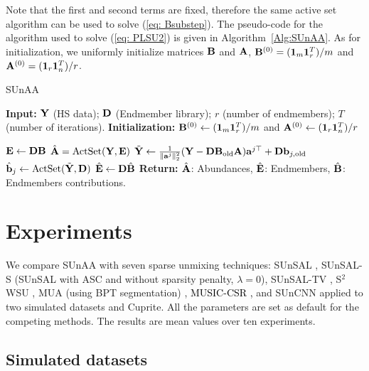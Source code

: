 Note that the first and second terms are fixed, therefore the same active set algorithm can be used to solve (\ref{eq: Bsubstep}). The pseudo-code for the algorithm used to solve (\ref{eq: PLSU2}) is given in Algorithm~\ref{Alg:SUnAA}. As for initialization, we uniformly initialize matrices $\mathbf B$ and $\mathbf A$, \ie $\mathbf B^{(0)}=({\bf 1}_{m}{\bf 1}_{r}^{T})/m$ and $\mathbf A^{(0)} = ({\bf 1}_{r}{\bf 1}_{n}^{T})/r$.


\begin{algorithm}[h]
\caption{{SUnAA}}
\label{Alg:SUnAA}
\begin{algorithmic}[1]
\State \textbf{Input:} ${\bf Y}$ (HS data); ${\bf D}$ (Endmember library); $r$ (number of endmembers); $T$ (number of iterations).
\State \textbf{Initialization:}  $\mathbf B^{(0)} \gets ({\bf 1}_{m}{\bf 1}_{r}^{T})/m$ and $\mathbf A^{(0)} \gets ({\bf 1}_{r}{\bf 1}_{n}^{T})/r$

\State $\mathbf E \gets \mathbf D \mathbf B$
\State  $\hat{\mathbf A} =\text{ActSet}(\mathbf Y,\mathbf E)$
\State $\Tilde{\mathbf Y} \gets \frac{1}{\|\mathbf a^j\|_2^2} (\mathbf Y - \mathbf D \mathbf B_{\text{old}} \mathbf A) \mathbf a^{j \top} + \mathbf D \mathbf b_{j, \text{old}}$
\State $\hat{\mathbf b}_j \gets \text{ActSet}(\Tilde{\mathbf Y}, \mathbf D)$
\EndFor
\EndFor
\State $\hat{\mathbf E} \gets \mathbf D \hat{\mathbf B}$
\State \textbf{Return:} $\hat{\mathbf A}$: Abundances, $\hat{\mathbf E}$: Endmembers, $\hat{\mathbf B}$: Endmembers contributions.
\end{algorithmic}
\end{algorithm}


\section{Experiments}
\label{sec:exp}

We compare SUnAA with seven sparse unmixing techniques: SUnSAL \cite{bioucas-dias_alternating_2010}, SUnSAL-S (SUnSAL with ASC and without sparsity penalty, \ie $\lambda=0$), SUnSAL-TV \cite{iordache_total_2012}, S$^2$WSU \cite{zhang_hyperspectral_2018}, MUA (using BPT segmentation) \cite{borsoi_fast_2019}, \textcolor{black}{MUSIC-CSR \cite{iordache_music-csr_2014},} and SUnCNN \cite{rasti_suncnn_2022} applied to two simulated datasets and Cuprite. All the parameters are set as default for the competing methods. The results are mean values over ten experiments. 

\subsection{Simulated datasets}

